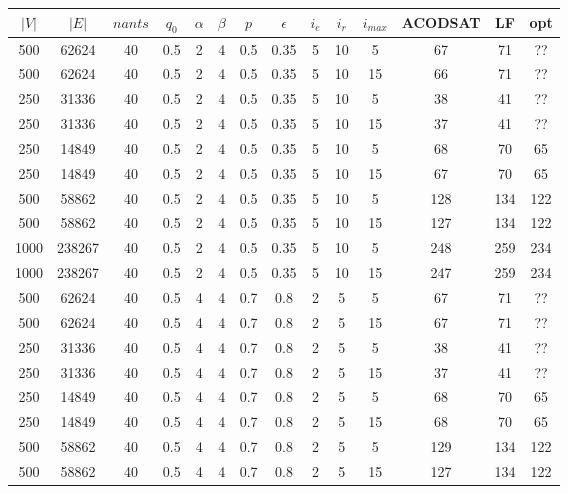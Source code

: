 \documentclass[11pt]{article}
\begin{document}
\begin{adjustbox}{center}
\footnotesize
    \begin{tabular}{|c|c|c|c|c|c|c|c|c|c|c|c|c|c|}
    	\hline
		$|V|$ & $|E|$ & $nants$ & $q_0$ & $\alpha$ & $\beta$ & $p$ & $\epsilon$ & $i_e$ &$i_r$ & $i_{max}$ & ACODSAT  & LF & opt \\ \hline \hline
		500 & 62624 & 40 & 0.5 & 2 & 4 & 0.5 & 0.35 & 5 & 10 & 5 & 67 & 71 & ?? \\ \hline
		500 & 62624 & 40 & 0.5 & 2 & 4 & 0.5 & 0.35 & 5 & 10 & 15 & 66 & 71 & ?? \\ \hline  \hline
		250 & 31336 & 40 & 0.5 & 2 & 4 & 0.5 & 0.35 & 5 & 10 & 5 & 38 & 41 & ?? \\ \hline
		250 & 31336 & 40 & 0.5 & 2 & 4 & 0.5 & 0.35 & 5 & 10 & 15 & 37 & 41 & ?? \\ \hline  \hline
		250 & 14849 & 40 & 0.5 & 2 & 4 & 0.5 & 0.35 & 5 & 10 & 5 & 68 & 70 & 65 \\ \hline
		250 & 14849 & 40 & 0.5 & 2 & 4 & 0.5 &  0.35 & 5 & 10 & 15 & 67 & 70 & 65 \\ \hline \hline
		500 & 58862 & 40 & 0.5 & 2 & 4 & 0.5 & 0.35 & 5 & 10 & 5 & 128 & 134 & 122 \\ \hline
		500 & 58862 & 40 & 0.5 & 2 & 4 & 0.5 &  0.35 & 5 & 10 & 15 & 127 & 134 & 122 \\ \hline \hline
		1000 & 238267 & 40 & 0.5 & 2 & 4 & 0.5 & 0.35 & 5 & 10 & 5 & 248 & 259 & 234 \\ \hline
		1000 & 238267 & 40 & 0.5 & 2 & 4 & 0.5 &  0.35 & 5 & 10 & 15 & 247 & 259 & 234 \\ \hline \hline \hline
		
		500 & 62624 & 40 & 0.5 & 4 & 4 & 0.7 & 0.8 & 2 & 5 & 5 & 67 & 71 & ?? \\ \hline
		500 & 62624 & 40 & 0.5 & 4 & 4 & 0.7 & 0.8 & 2 & 5 & 15 & 67 & 71 & ?? \\ \hline  \hline
		250 & 31336 & 40 & 0.5 & 4 & 4 & 0.7 & 0.8 & 2 & 5 & 5 & 38 & 41 & ?? \\ \hline
		250 & 31336 & 40 & 0.5 & 4 & 4 & 0.7 & 0.8 & 2 & 5 & 15 & 37 & 41 & ?? \\ \hline  \hline
		250 & 14849 & 40 & 0.5 & 4 & 4 & 0.7 & 0.8 & 2 & 5 & 5 & 68 & 70 & 65 \\ \hline
		250 & 14849 & 40 & 0.5 & 4 & 4 & 0.7 &  0.8 & 2 & 5 & 15 & 68 & 70 & 65 \\ \hline \hline
		500 & 58862 & 40 & 0.5 & 4 & 4 & 0.7 & 0.8 & 2 & 5 & 5 & 129 & 134 & 122 \\ \hline
		500 & 58862 & 40 & 0.5 & 4 & 4 & 0.7 &  0.8 & 2 & 5 & 15 & 127 & 134 & 122 \\ \hline
		
    \end{tabular}
\end{adjustbox}
\end{document}
